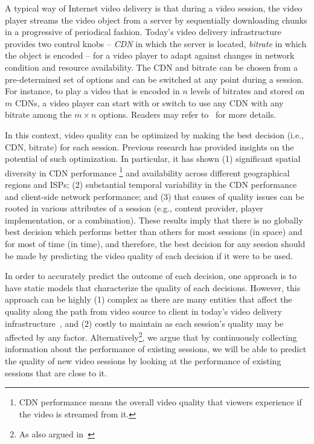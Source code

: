  A typical way of Internet video delivery is that during a video session, the video player streams the video object from a server by sequentially downloading chunks in a progressive of periodical fashion. Today's video delivery infrastructure provides two control knobs -- {\it CDN} in which the server is located, {\it bitrate} in which the object is encoded -- for a video player to adapt against changes in network condition and resource availability. The CDN and bitrate can be chosen from a pre-determined set of options and can be switched at any point during a session. For instance, to play a video that is encoded in $n$ levels of bitrates and stored on $m$ CDNs, a video player can start with or switch to use any CDN with any bitrate among the $m\times n$ options.
Readers may refer to~\cite{conext12} for more details. 

 In this context, video quality can be optimized by making the best decision (i.e., CDN, bitrate) for each session. Previous research \cite{sigcomm12,conext13} has provided insights on the potential of such optimization. In particular, it has shown (1) significant spatial diversity in CDN performance \footnote{CDN performance means the overall video quality that viewers experience if the video is streamed from it.} and availability across different geographical regions and ISPs; (2) substantial temporal variability in the CDN performance and client-side network performance; and (3) that causes of quality issues can be rooted in various attributes of a session (e.g., content provider, player implementation, or a combination). These results imply that there is no globally best decision which performs better than others for most sessions (in space) and for most of time (in time), and therefore, the best decision for any session should be made by predicting the video quality of each decision if it were to be used. 


In order to accurately predict the outcome of each decision, one approach is to have static models that characterize the quality of each decisions. However, this approach can be highly (1) complex as there are many entities that affect the quality along the path from video source to client in today's video delivery infrastructure~\cite{?}, and (2) costly to maintain as each session's quality may be affected by any factor. Alternatively\footnote{As also argued in~\cite{sigcomm13DataDrivenTcp}}, we argue that by continuously collecting information about the performance of existing sessions, we will be able to predict the quality of new video sessions by looking at the performance of existing sessions that are close to it.



